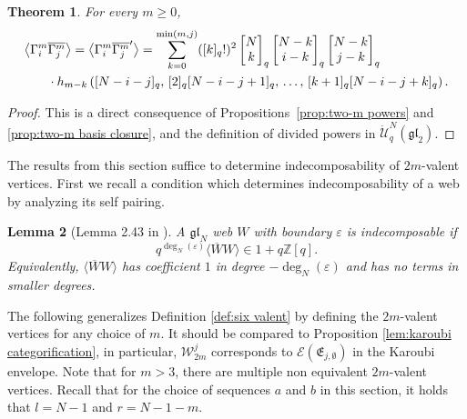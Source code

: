 \documentclass[12pt]{amsart}
\newtheorem{theorem}{Theorem}[section]
\newtheorem{lemma}[theorem]{Lemma}
\theoremstyle{definition}
\theoremstyle{remark}
\numberwithin{equation}{section}
\numberwithin{figure}{section}
\newcommand{\GL}{\mathfrak{gl}}
\newcommand{\boundarydeg}{\deg_N}
\begin{document}
\begin{theorem}\label{prop:two-m closed powers}
For every $m\geq 0$,
\begin{align}\label{eq:computing the pairing}
 \bigl\langle \Gamma_i^m &\overline{\Gamma_j^m}\bigr\rangle
    =\bigl\langle \Gamma_i^m\overline{\Gamma_j^m}'\bigr\rangle  = \sum_{k=0}^{\min(m,j)}([k]_q!)^2
    \begin{bmatrix}N\\k\end{bmatrix}_q
    \begin{bmatrix}N-k\\i-k\end{bmatrix}_q
    \begin{bmatrix}N-k\\j-k\end{bmatrix}_q\notag\\
    &\cdot
    h_{m-k}\left(
    [N-i-j]_q,\,
    [2]_q[N-i-j+1]_q,\,
    \ldots,\,
    [k+1]_q[N-i-j+k]_q
\right).
\end{align}
\end{theorem}

\begin{proof}
This is a direct consequence of Propositions~\ref{prop:two-m powers} and  \ref{prop:two-m basis closure}, and the definition of divided powers in $\dot{\mathcal U}_q^{N}(\GL_2)$. 
\end{proof}

The results from this section suffice to determine indecomposability of $2m$-valent vertices. First we recall a condition which determines indecomposability of a web by analyzing its self pairing.

\begin{lemma}[Lemma 2.43 in \cite{grlj20266valentvertexmathfrakglnweb}] \label{WebPairIndecompo}
    A \(\GL_N\) web \(W\) with boundary \(\varepsilon\) is indecomposable if
    \[
        q^{\boundarydeg(\varepsilon)}\langle \overline{W}W \rangle \in 1+q\mathbb{Z}[q].
    \]
    Equivalently, \(\langle \overline{W}W \rangle\) has coefficient \(1\) in degree \(-\boundarydeg(\varepsilon)\) and has no terms in smaller degrees.
\end{lemma}

The following generalizes Definition \ref{def:six valent} by defining the $2m$-valent vertices for any choice of $m$. It should be compared to Proposition \ref{lem:karoubi categorification}, in particular, $\mathcal{W}^j_{2m}$ corresponds to $\mathcal E(\mathfrak{E}_{j,\emptyset})$ in the Karoubi envelope. Note that for $m > 3$, there are multiple non equivalent $2m$-valent vertices. Recall that for the choice of sequences $a$ and $b$ in this section, it holds that $l = N-1$ and $r = N - 1 -m$.
\end{document}
